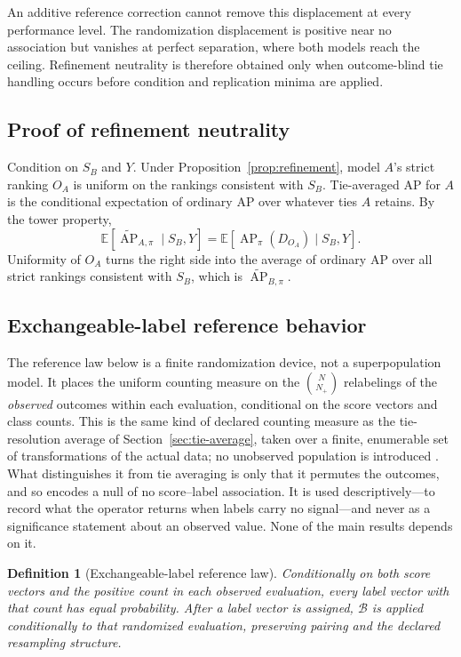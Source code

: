 \documentclass[11pt]{article}
\newcommand{\AP}{\operatorname{AP}}
\newcommand{\Boot}{\mathcal{B}}
\newcommand{\E}{\mathbb{E}}
\newcommand{\APta}{\widetilde{\AP}}
\newtheorem{definition}{Definition}
\theoremstyle{remark}
\begin{document}
An additive reference correction cannot remove this displacement at every
performance level. The randomization displacement is positive near no
association but vanishes at perfect separation, where both models reach the
ceiling. Refinement neutrality is therefore obtained only when outcome-blind
tie handling occurs before condition and replication minima are applied.

\subsection{Proof of refinement neutrality}
\label{app:proof-refinement}

Condition on $S_B$ and $Y$. Under Proposition~\ref{prop:refinement}, model
$A$'s strict ranking $O_A$ is uniform on the rankings consistent with $S_B$.
Tie-averaged AP for $A$ is the conditional expectation of ordinary AP over
whatever ties $A$ retains. By the tower property,
\[
\E[\APta_{A,\pi}\mid S_B,Y]
=
\E[\AP_\pi(D_{O_A})\mid S_B,Y].
\]
Uniformity of $O_A$ turns the right side into the average of ordinary AP over
all strict rankings consistent with $S_B$, which is $\APta_{B,\pi}$.

\subsection{Exchangeable-label reference behavior}

The reference law below is a finite randomization device, not a superpopulation
model. It places the uniform counting measure on the $\binom{N}{N_+}$
relabelings of the \emph{observed} outcomes within each evaluation, conditional
on the score vectors and class counts. This is the same kind of declared
counting measure as the tie-resolution average of
Section~\ref{sec:tie-average}, taken over a finite, enumerable set of
transformations of the actual data; no unobserved population is introduced
\cite{fisher1935design,pitman1937significance}. What distinguishes it from tie
averaging is only that it permutes the outcomes, and so encodes a null of no
score--label association. It is used descriptively---to record what the operator
returns when labels carry no signal---and never as a significance statement
about an observed value. None of the main results depends on it.

\begin{definition}[Exchangeable-label reference law]
Conditionally on both score vectors and the positive count in each observed
evaluation, every label vector with that count has equal probability. After a
label vector is assigned, $\Boot$ is applied conditionally to that randomized
evaluation, preserving pairing and the declared resampling structure.
\end{definition}
\end{document}
